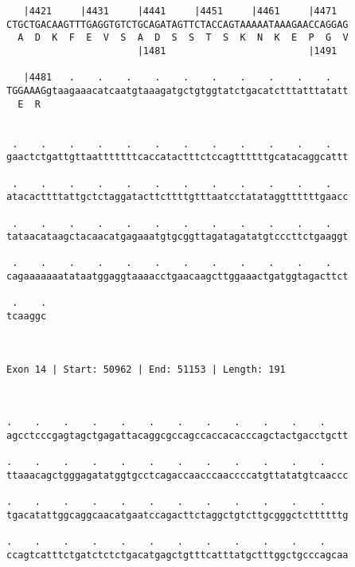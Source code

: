 \documentclass{article}
\begin{document}
\begin{Verbatim}
   |4421     |4431     |4441     |4451     |4461     |4471  
CTGCTGACAAGTTTGAGGTGTCTGCAGATAGTTCTACCAGTAAAAATAAAGAACCAGGAG
  A  D  K  F  E  V  S  A  D  S  S  T  S  K  N  K  E  P  G  V
                       |1481                         |1491  
  
   |4481   .    .    .    .    .    .    .    .    .    .   
TGGAAAGgtaagaaacatcaatgtaaagatgctgtggtatctgacatctttatttatatt
  E  R                                                      
                                                            
  
 .    .    .    .    .    .    .    .    .    .    .    .   
gaactctgattgttaatttttttcaccatactttctccagttttttgcatacaggcattt
                                                            
 .    .    .    .    .    .    .    .    .    .    .    .   
atacacttttattgctctaggatacttcttttgtttaatcctatataggttttttgaacc
                                                            
 .    .    .    .    .    .    .    .    .    .    .    .   
tataacataagctacaacatgagaaatgtgcggttagatagatatgtcccttctgaaggt
                                                            
 .    .    .    .    .    .    .    .    .    .    .    .   
cagaaaaaaatataatggaggtaaaacctgaacaagcttggaaactgatggtagacttct
                                                            
 .    .
tcaaggc
       
       
 
Exon 14 | Start: 50962 | End: 51153 | Length: 191



.    .    .    .    .    .    .    .    .    .    .    .    
agcctcccgagtagctgagattacaggcgccagccaccacacccagctactgacctgctt
                                                            
.    .    .    .    .    .    .    .    .    .    .    .    
ttaaacagctgggagatatggtgcctcagaccaacccaaccccatgttatatgtcaaccc
                                                            
.    .    .    .    .    .    .    .    .    .    .    .    
tgacatattggcaggcaacatgaatccagacttctaggctgtcttgcgggctcttttttg
                                                            
.    .    .    .    .    .    .    .    .    .    .    .    
ccagtcatttctgatctctctgacatgagctgtttcatttatgctttggctgcccagcaa
                                                            

\end{Verbatim}
\end{document}
